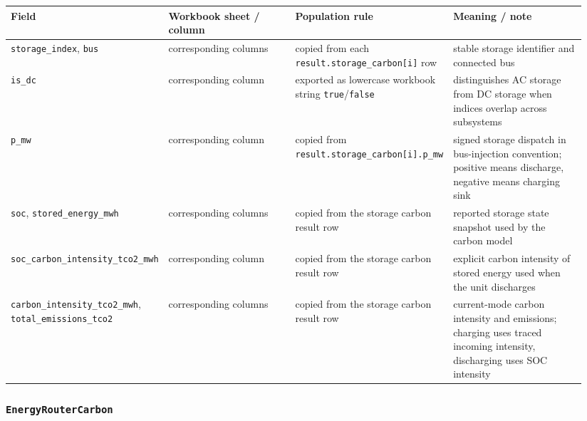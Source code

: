 \begin{longtable}{@{}L{0.18\linewidth}L{0.26\linewidth}L{0.22\linewidth}L{0.28\linewidth}@{}}
\toprule
Field & Workbook sheet / column & Population rule & Meaning / note \\
\midrule
\endhead
\texttt{storage\_index}, \texttt{bus} & corresponding columns & copied from each \texttt{result.storage\_carbon[i]} row & stable storage identifier and connected bus \\
\texttt{is\_dc} & corresponding column & exported as lowercase workbook string \texttt{true}/\texttt{false} & distinguishes AC storage from DC storage when indices overlap across subsystems \\
\texttt{p\_mw} & corresponding column & copied from \texttt{result.storage\_carbon[i].p\_mw} & signed storage dispatch in bus-injection convention; positive means discharge, negative means charging sink \\
\texttt{soc}, \texttt{stored\_energy\_mwh} & corresponding columns & copied from the storage carbon result row & reported storage state snapshot used by the carbon model \\
\texttt{soc\_carbon\_intensity\_tco2\_mwh} & corresponding column & copied from the storage carbon result row & explicit carbon intensity of stored energy used when the unit discharges \\
\texttt{carbon\_intensity\_tco2\_mwh}, \texttt{total\_emissions\_tco2} & corresponding columns & copied from the storage carbon result row & current-mode carbon intensity and emissions; charging uses traced incoming intensity, discharging uses SOC intensity \\
\bottomrule
\end{longtable}

\subsubsection*{\texttt{EnergyRouterCarbon}}

